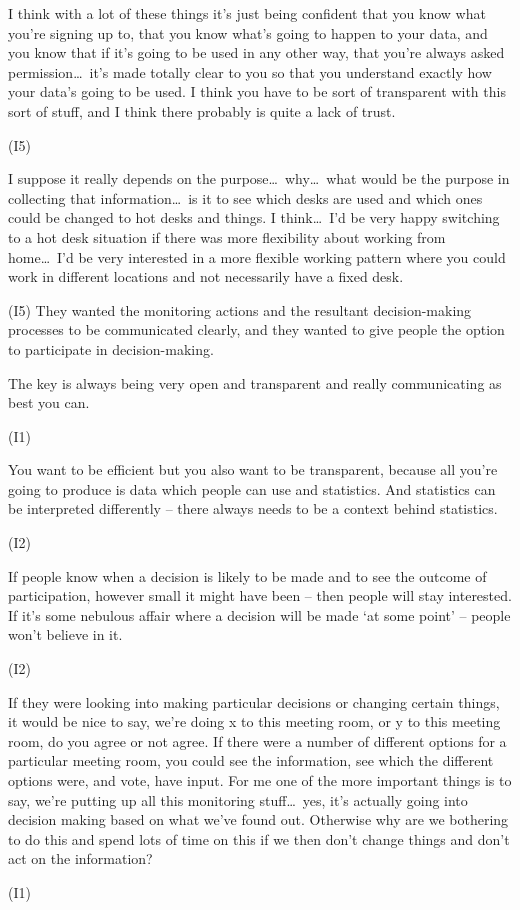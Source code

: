\begin{qt}I think with a lot of these things it’s just being confident that you
know what you’re signing up to, that you know what’s going to happen
to your data, and you know that if it’s going to be used in any other
way, that you’re always asked permission\ldots\  it’s made totally clear to
you so that you understand exactly how your data’s going to be used. I
think you have to be sort of transparent with this sort of stuff, and
I think there probably is quite a lack of trust.\end{qt} (I5)

\begin{qt}I suppose it really depends on the purpose\ldots\  why\ldots\  what would be the
purpose in collecting that information\ldots\  is it to see which desks are
used and which ones could be changed to hot desks and things. I
think\ldots\  I’d be very happy switching to a hot desk situation if there was
more flexibility about working from home\ldots\  I’d be very interested in a
more flexible working pattern where you could work in different
locations and not necessarily have a fixed desk.\end{qt} (I5)
They wanted the monitoring actions and the resultant decision-making
processes to be communicated clearly, and they wanted to give people
the option to participate in decision-making.

\begin{qt}The key is always being very open and transparent and really
communicating as best you can.\end{qt} (I1)

\begin{qt}You want to be efficient but you also want to be transparent, because
all you’re going to produce is data which people can use and
statistics. And statistics can be interpreted differently – there
always needs to be a context behind statistics.\end{qt} (I2)

\begin{qt}If people know when a decision is likely to be made and to see the
outcome of participation, however small it might have been – then
people will stay interested. If it’s some nebulous affair where a
decision will be made ‘at some point’ – people won’t believe in it.\end{qt}
(I2)

\begin{qt}If they were looking into making particular decisions or changing
certain things, it would be nice to say, we’re doing x to this meeting
room, or y to this meeting room, do you agree or not agree. If there
were a number of different options for a particular meeting room, you
could see the information, see which the different options were, and
vote, have input. For me one of the more important things is to say,
we’re putting up all this monitoring stuff\ldots\  yes, it’s actually going
into decision making based on what we’ve found out. Otherwise why are
we bothering to do this and spend lots of time on this if we then
don’t change things and don’t act on the information?\end{qt} (I1)

